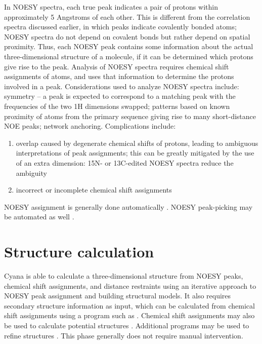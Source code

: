 In NOESY spectra, each true peak indicates a pair of protons within 
approximately 5 Angstroms of each other.  This is different from the 
correlation spectra discussed earlier, in which peaks indicate covalently 
bonded atoms; NOESY spectra do not depend on covalent bonds but rather 
depend on spatial proximity.  Thus, each NOESY peak contains some information 
about the actual three-dimensional structure of a molecule, if it can be 
determined which protons give rise to the peak.  Analysis of NOESY spectra 
requires chemical shift assignments of atoms, and uses that information to 
determine the protons involved in a peak.  Considerations used to analyze 
NOESY spectra include: symmetry -- a peak is expected to correspond to a 
matching peak with the frequencies of the two 1H dimensions swapped; patterns 
based on known proximity of atoms from the primary sequence giving rise to 
many short-distance NOE peaks; network anchoring.  Complications include: 
\begin{enumerate}
  \item overlap caused by degenerate chemical shifts of protons, leading to 
ambiguous interpretations of peak assignments; this can be greatly mitigated 
by the use of an extra dimension:  15N- or 13C-edited NOESY spectra reduce 
the ambiguity
  \item incorrect or incomplete chemical shift assignments
\end{enumerate}

NOESY assignment is generally done automatically \cite{cyana2004, aria2003}.  
NOESY peak-picking may be automated as well \cite{munin, korzhnev2001munin}.


\section{Structure calculation}

Cyana is able to calculate a three-dimensional structure from NOESY peaks, 
chemical shift assignments, and distance restraints \cite{cyana2004, aria2003} 
using an iterative approach to NOESY peak assignment and building structural 
models.  It also requires secondary structure information as input, which can 
be calculated from chemical shift assignments using a program such as 
\cite{talos+}.  Chemical shift assignments may also be used to 
calculate potential structures \cite{cs-rosetta}.  Additional programs 
may be used to refine structures \cite{amber, xplor-nih}.  This phase 
generally does not require manual intervention.


